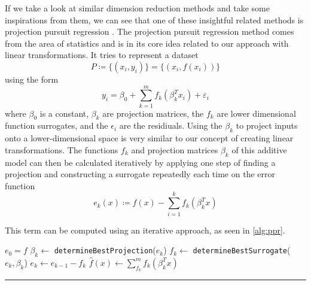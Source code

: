 \documentclass[
  a4paper,  %
  twoside,  %
  bibliography=totoc,
  headsepline,
  cleardoublepage=empty,
  parskip=half,
  draft=false
]{scrbook}
\newcommand{\delimit}{{\color{silver}\noindent\rule{\textwidth}{1pt}}}
\begin{document}
If we take a look at similar dimension reduction methods and take some inspirations from them, we can see that one of these insightful related methods is projection pursuit regression \cite{huber1985projection}.
The projection pursuit regression method comes from the area of statistics and is in its core idea related to our approach with linear transformations.
It tries to represent a dataset
\begin{equation}
P \coloneqq \{(x_i, y_i)\}=\{(x_i, f(x_i))\}
\end{equation}
using the form
\begin{equation}
y_i=\beta_0 + \sum_{k=1}^m f_k(\beta_k^T x_i) + \varepsilon_i
\label{eq:ppr}
\end{equation}
where $\beta_0$ is a constant, $\beta_k$ are projection matrices, the $f_k$ are lower dimensional function surrogates, and the $\epsilon_i$ are the residiuals.
Using the $\beta_k$ to project inputs onto a lower-dimensional space is very similar to our concept of creating linear transformations.
The functions $f_k$ and projection matrices $\beta_k$ of this additive model can then be calculated iteratively by applying one step of finding a projection and constructing a surrogate repeatedly each time on the error function
\begin{equation}
e_k(x) \coloneqq f(x) - \sum_{i=1}^k f_k(\beta_k^T x)
\end{equation}

This term can be computed using an iterative approach, as seen in \cref{alg:ppr}.

\begin{mdframed}[style=algstyle,frametitle={\textbf{function} \texttt{projectionPursuitRegression}{$(f, k_{\text{max}})$}}]
\normalsize
\vspace{5.5mm}
\begin{algorithmic}[1]

    \State $e_0 = f$
    	\State $\beta_k \gets$ \texttt{determineBestProjection}($e_k$)
    	\State $f_k \gets$ \texttt{determineBestSurrogate}($e_k, \beta_k$)
    	\State $e_k \gets e_{k - 1} - f_k$
    \EndFor
    \State $\hat{f}(x) \gets \sum_{f_k}^m f_k(\beta_k^T x)$
    \State {}
\end{algorithmic}

\vspace{-1.5mm}
\delimit

	\label{alg:ppr}
\end{mdframed}
\end{document}

